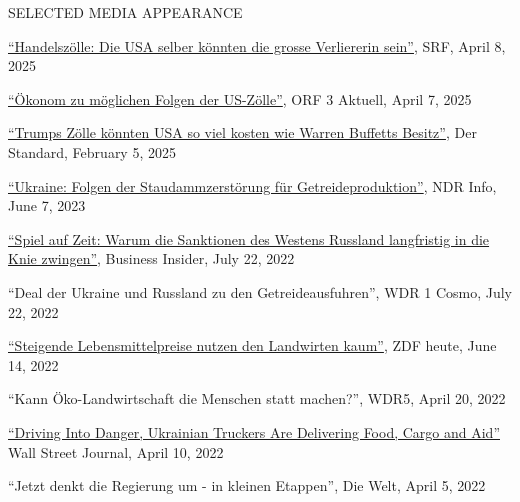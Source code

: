 \documentclass{article}
\begin{document}
\begin{minipage}[t]{0.12\textwidth}
    {\selectfont SELECTED MEDIA \mbox APPEARANCE} \\
\end{minipage}
\hspace{5mm}
\begin{minipage}[t]{0.8\textwidth}
  \href{https://www.srf.ch/audio/echo-der-zeit/handelszoelle-die-usa-selber-koennten-die-grosse-verliererin-sein?partId=77nj5adJX0fKQd92D0cUOK53Vmw}{``Handelszölle: Die USA selber könnten die grosse Verliererin sein''}, SRF, April 8, 2025 \par
  \href{https://on.orf.at/video/14270682/15857146/oekonom-zu-moeglichen-folgen-der-us-zoelle}{``Ökonom zu möglichen Folgen der US-Zölle''}, ORF 3 Aktuell, April 7, 2025 \par
    \href{https://www.derstandard.de/story/3000000256055/trumps-zoelle-koennten-usa-so-viel-kosten-wie-warren-buffett-besitzt}{``Trumps Zölle könnten USA so viel kosten wie Warren Buffetts Besitz''}, Der Standard, February 5, 2025 \par
    \href{https://www.ndr.de/nachrichten/info/Wirtschaft-Folgen-der-Staudammzerstoerung-fuer-Getreideproduktion,audio1398696.html}{``Ukraine: Folgen der Staudammzerstörung für Getreideproduktion''}, NDR Info, June 7, 2023 \par
    \href{https://www.businessinsider.de/politik/welt/spiel-auf-zeit-warum-die-bundesregierung-und-experten-glauben-dass-die-sanktionen-des-westens-russland-langfristig-in-die-knie-zwingen-werden/}{``Spiel auf Zeit: Warum die Sanktionen des Westens Russland langfristig in die Knie zwingen''}, Business Insider, July 22, 2022 \par
    ``Deal der Ukraine und Russland zu den Getreideausfuhren'', WDR 1 Cosmo, July 22, 2022 \par
    \href{https://www.zdf.de/nachrichten/heute-19-uhr/bauerntag-luebeck-oezdemir-video-100.html}{``Steigende Lebensmittelpreise nutzen den Landwirten kaum''}, ZDF heute, June 14, 2022 \par
    ``Kann Öko-Landwirtschaft die Menschen statt machen?'', WDR5, April 20, 2022 \par
    \href{https://www.wsj.com/articles/driving-into-danger-ukrainian-truckers-are-delivering-food-cargo-and-aid-11649595601}{``Driving Into Danger, Ukrainian Truckers Are Delivering Food, Cargo and Aid''} Wall Street Journal, April 10, 2022 \par
    ``Jetzt denkt die Regierung um - in kleinen Etappen'', Die Welt, April 5, 2022 \par

\end{minipage}
\end{document}
